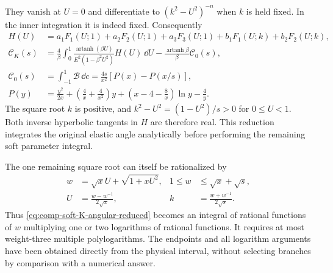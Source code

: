 They vanish at $U=0$ and differentiate to $(k^2-U^2)^{-n}$ when $k$
is held fixed. In the inner integration it is indeed fixed. Consequently
\begin{align}
 H(U)&=a_1F_1(U;1)+a_2F_2(U;1)+a_3F_3(U;1)
 +b_1F_1(U;k)+b_2F_2(U;k),\\
 \mathcal C_K(s)&=\frac4\beta\int_0^1
 \frac{\operatorname{artanh}(\beta U)}{E^2(1-\beta^2U^2)}
 H(U)\,\dd U-\frac{\operatorname{artanh}\beta}{\beta}
 \mathcal C_0(s),
 \label{eq:comp-soft-K-angular-reduced}\\
 \mathcal C_0(s)&=\int_{-1}^1\mathcal B\,\dd c
 =\frac{4s}{x^2}[P(x)-P(x/s)],\\
 P(y)&=\frac{y^2}{2x}+\left(\frac4x+\frac4{x^2}\right)y
 +\left(x-4-\frac8x\right)\ln y-\frac4y.
\end{align}
The square root $k$ is positive, and
$k^2-U^2=(1-U^2)/s>0$ for $0\leq U<1$. Both inverse hyperbolic tangents
in $H$ are therefore real. This reduction integrates the original elastic
angle analytically before performing the remaining soft parameter integral.

The one remaining square root can itself be rationalized by
\begin{align}
 w&=\sqrt{x}U+\sqrt{1+xU^2},
 &1\leq w&\leq\sqrt{x}+\sqrt{s},\\
 U&=\frac{w-w^{-1}}{2\sqrt{x}},
 &k&=\frac{w+w^{-1}}{2\sqrt{s}}.
\end{align}
Thus \eqref{eq:comp-soft-K-angular-reduced} becomes an integral of
rational functions of $w$ multiplying one or two logarithms of rational
functions. It requires at most weight-three multiple polylogarithms.
The endpoints and all logarithm arguments have been obtained directly
from the physical interval, without selecting branches by comparison
with a numerical answer.

